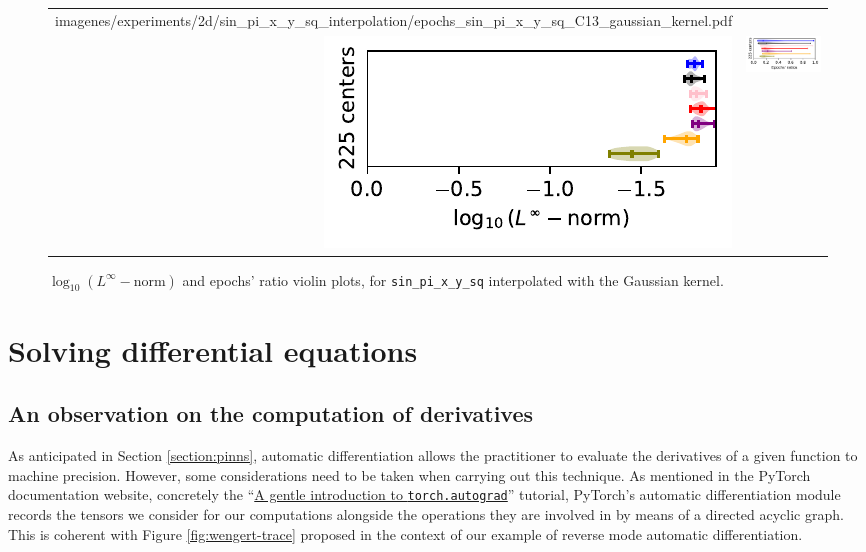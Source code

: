 \documentclass[12pt]{report} %
\begin{document}
\begin{figure}[h]
\begin{tabular}{rl}
{        {imagenes/experiments/2d/sin_pi_x_y_sq_interpolation/epochs_sin_pi_x_y_sq_C13_gaussian_kernel.pdf}}
    \\
    {\includegraphics[width=.5\textwidth, trim={0 0.2cm 0 0},clip=true]
    {imagenes/experiments/2d/sin_pi_x_y_sq_interpolation/linf_sin_pi_x_y_sq_C15_gaussian_kernel.pdf}}
                                                                                                              & 
  {\includegraphics[width=.44\textwidth, trim={.7cm 0.2cm 0 0},clip=true]
        {imagenes/experiments/2d/sin_pi_x_y_sq_interpolation/epochs_sin_pi_x_y_sq_C15_gaussian_kernel.pdf}}
  \end{tabular}
  \caption{$\log_{10}(L^\infty-\text{norm})$ and epochs' ratio violin plots, for \texttt{sin\_pi\_x\_y\_sq} interpolated with the Gaussian kernel.}
  \label{fig:statistic-result-sin-pi-x-y-sq-gaussian-kernel}
\end{figure}

\clearpage
\section*{Solving differential equations}

\subsection*{An observation on the computation of derivatives}

As anticipated in Section \ref{section:pinns}, automatic differentiation allows the
practitioner to evaluate the derivatives of a given function to machine precision.
However, some considerations need to be taken when carrying out this technique.
As mentioned in the PyTorch documentation website, concretely the
``\href{https://pytorch.org/tutorials/beginner/blitz/autograd_tutorial.html}{A gentle
  introduction to \texttt{torch.autograd}}'' tutorial, PyTorch's automatic differentiation
module records the tensors we consider for our computations alongside the operations
they are involved in by means of a directed acyclic graph. This is coherent with
Figure \ref{fig:wengert-trace} proposed in the context of our example of reverse
mode automatic differentiation.
\end{document}
